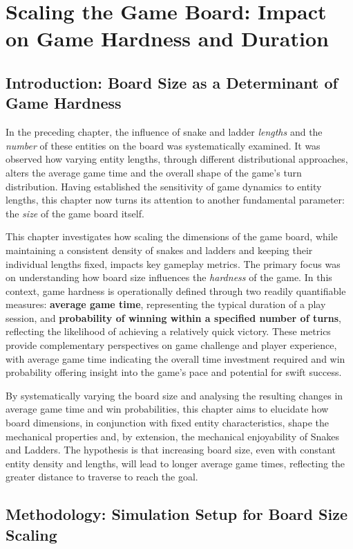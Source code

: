 \chapter{Scaling the Game Board: Impact on Game Hardness and Duration}

\section{Introduction: Board Size as a Determinant of Game Hardness}

In the preceding chapter, the influence of snake and ladder \textit{lengths} and the \textit{number} of these entities on the board was systematically examined. It was observed how varying entity lengths, through different distributional approaches, alters the average game time and the overall shape of the game's turn distribution.  Having established the sensitivity of game dynamics to entity lengths, this chapter now turns its attention to another fundamental parameter: the \textit{size} of the game board itself.

This chapter investigates how scaling the dimensions of the game board, while maintaining a consistent density of snakes and ladders and keeping their individual lengths fixed, impacts key gameplay metrics.  The primary focus was on understanding how board size influences the \textit{hardness} of the game. In this context, game hardness is operationally defined through two readily quantifiable measures: \textbf{average game time}, representing the typical duration of a play session, and \textbf{probability of winning within a specified number of turns}, reflecting the likelihood of achieving a relatively quick victory.  These metrics provide complementary perspectives on game challenge and player experience, with average game time indicating the overall time investment required and win probability offering insight into the game's pace and potential for swift success.

By systematically varying the board size and analysing the resulting changes in average game time and win probabilities, this chapter aims to elucidate how board dimensions, in conjunction with fixed entity characteristics, shape the mechanical properties and, by extension, the mechanical enjoyability of Snakes and Ladders.  The hypothesis is that increasing board size, even with constant entity density and lengths, will lead to longer average game times, reflecting the greater distance to traverse to reach the goal. 


\section{Methodology: Simulation Setup for Board Size Scaling}

